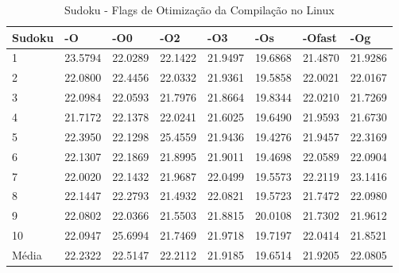 \begin{table}[!ht]
\centering
\tiny
\caption{Sudoku - Flags de Otimização da Compilação no Linux}
\label{tab:otimizacao_compilacao:linux:sudoku}
\begin{tabular}{llllllll}
\textbf{Sudoku}            & \textbf{-O}  & \textbf{-O0}   & \textbf{-O2} & \textbf{-O3} & \textbf{-Os} & \textbf{-Ofast} & \textbf{-Og} \\ \toprule
1                          & 23.5794      & 22.0289        & 22.1422      & 21.9497      & 19.6868      & 21.4870         & 21.9286    \\ 
2                          & 22.0800      & 22.4456        & 22.0332      & 21.9361      & 19.5858      & 22.0021         & 22.0167    \\ 
3                          & 22.0984      & 22.0593        & 21.7976      & 21.8664      & 19.8344      & 22.0210         & 21.7269    \\ 
4                          & 21.7172      & 22.1378        & 22.0241      & 21.6025      & 19.6490      & 21.9593         & 21.6730    \\ 
5                          & 22.3950      & 22.1298        & 25.4559      & 21.9436      & 19.4276      & 21.9457         & 22.3169    \\ 
6                          & 22.1307      & 22.1869        & 21.8995      & 21.9011      & 19.4698      & 22.0589         & 22.0904    \\ 
7                          & 22.0020      & 22.1432        & 21.9687      & 22.0499      & 19.5573      & 22.2119         & 23.1416    \\ 
8                          & 22.1447      & 22.2793        & 21.4932      & 22.0821      & 19.5723      & 21.7472         & 22.0980    \\ 
9                          & 22.0802      & 22.0366        & 21.5503      & 21.8815      & 20.0108      & 21.7302         & 21.9612    \\ 
10                         & 22.0947      & 25.6994        & 21.7469      & 21.9718      & 19.7197      & 22.0414         & 21.8521    \\ \bottomrule
Média                      & 22.2322      & 22.5147        & 22.2112      & 21.9185      & 19.6514      & 21.9205         & 22.0805    \\ 
\end{tabular}
\end{table}

